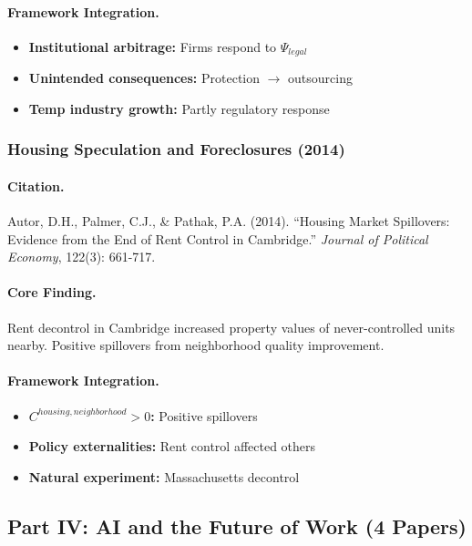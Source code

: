 \paragraph{Framework Integration.}
\begin{itemize}
  \item \textbf{Institutional arbitrage:} Firms respond to $\Psi_{legal}$
  \item \textbf{Unintended consequences:} Protection $\to$ outsourcing
  \item \textbf{Temp industry growth:} Partly regulatory response
\end{itemize}

\subsubsection{Housing Speculation and Foreclosures (2014)}

\paragraph{Citation.}
Autor, D.H., Palmer, C.J., \& Pathak, P.A. (2014). ``Housing Market
Spillovers: Evidence from the End of Rent Control in Cambridge.''
\emph{Journal of Political Economy}, 122(3): 661-717.

\paragraph{Core Finding.}
Rent decontrol in Cambridge increased property values of never-controlled
units nearby. Positive spillovers from neighborhood quality improvement.

\paragraph{Framework Integration.}
\begin{itemize}
  \item \textbf{$C^{housing,neighborhood} > 0$:} Positive spillovers
  \item \textbf{Policy externalities:} Rent control affected others
  \item \textbf{Natural experiment:} Massachusetts decontrol
\end{itemize}

\subsection{Part IV: AI and the Future of Work (4 Papers)}

